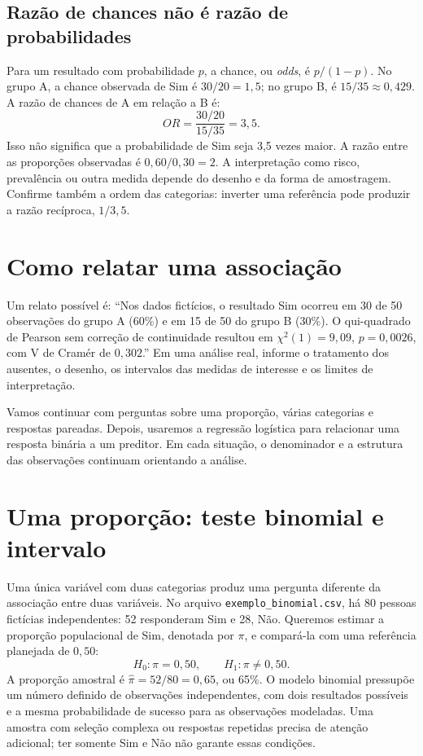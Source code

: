 \subsection{Razão de chances não é razão de probabilidades}

Para um resultado com probabilidade $p$, a chance, ou \textit{odds}, é $p/(1-p)$. No grupo A, a chance observada de Sim é $30/20=1{,}5$; no grupo B, é $15/35\approx0{,}429$. A razão de chances de A em relação a B é:
\[
OR=\frac{30/20}{15/35}=3{,}5.
\]
Isso não significa que a probabilidade de Sim seja 3,5 vezes maior. A razão entre as proporções observadas é $0{,}60/0{,}30=2$. A interpretação como risco, prevalência ou outra medida depende do desenho e da forma de amostragem. Confirme também a ordem das categorias: inverter uma referência pode produzir a razão recíproca, $1/3{,}5$.

\section{Como relatar uma associação}

Um relato possível é: ``Nos dados fictícios, o resultado Sim ocorreu em 30 de 50 observações do grupo A (60\%) e em 15 de 50 do grupo B (30\%). O qui-quadrado de Pearson sem correção de continuidade resultou em $\chi^2(1)=9{,}09$, $p=0{,}0026$, com V de Cramér de $0{,}302$.'' Em uma análise real, informe o tratamento dos ausentes, o desenho, os intervalos das medidas de interesse e os limites de interpretação.

Vamos continuar com perguntas sobre uma proporção, várias categorias e respostas pareadas. Depois, usaremos a regressão logística para relacionar uma resposta binária a um preditor. Em cada situação, o denominador e a estrutura das observações continuam orientando a análise.

\section{Uma proporção: teste binomial e intervalo}
\label{sec:binomial}

Uma única variável com duas categorias produz uma pergunta diferente da associação entre duas variáveis. No arquivo \texttt{exemplo\_binomial.csv}, há 80 pessoas fictícias independentes: 52 responderam Sim e 28, Não. Queremos estimar a proporção populacional de Sim, denotada por $\pi$, e compará-la com uma referência planejada de $0{,}50$:
\[
H_0:\pi=0{,}50,\qquad H_1:\pi\neq0{,}50.
\]
A proporção amostral é $\widehat{\pi}=52/80=0{,}65$, ou 65\%. O modelo binomial pressupõe um número definido de observações independentes, com dois resultados possíveis e a mesma probabilidade de sucesso para as observações modeladas. Uma amostra com seleção complexa ou respostas repetidas precisa de atenção adicional; ter somente Sim e Não não garante essas condições.

